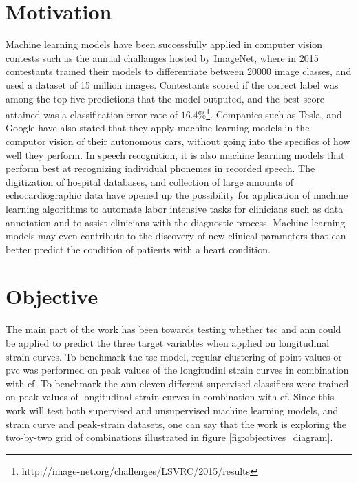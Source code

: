 \section{Motivation} \label{sec:motivation}

Machine learning models have been successfully applied in computer vision contests such as the annual challanges hosted by ImageNet, where in 2015 contestants trained their models to differentiate between 20000 image classes, and used a dataset of 15 million images. Contestants scored if the correct label was among the top five predictions that the model outputed, and the best score attained was a classification error rate of $16.4\%$\footnote{http://image-net.org/challenges/LSVRC/2015/results}. Companies such as Tesla, and Google have also stated that they apply machine learning models in the computor vision of their autonomous cars, without going into the specifics of how well they perform. In speech recognition, it is also machine learning models that perform best at recognizing individual phonemes in recorded speech. The digitization of hospital databases, and collection of large amounts of echocardiographic data have opened up the possibility for application of machine learning algorithms to automate labor intensive tasks for clinicians such as data annotation and to assist clinicians with the diagnostic process. Machine learning models may even contribute to the discovery of new clinical parameters that can better predict the condition of patients with a heart condition.

\section{Objective} \label{sec:objective}

The main part of the work has been towards testing whether \acrfull{tsc} and \acrfull{ann} could be applied to predict the three target variables when applied on longitudinal strain curves. To benchmark the \acrshort{tsc} model, regular clustering of point values or \acrfull{pvc} was performed on peak values of the longitudinl strain curves in combination with \acrshort{ef}. To benchmark the \acrfull{ann} eleven different supervised classifiers were trained on peak values of longitudinal strain curves in combination with \acrshort{ef}. Since this work will test both supervised and unsupervised machine learning models, and strain curve and peak-strain datasets, one can say that the work is exploring the two-by-two grid of combinations illustrated in figure \ref{fig:objectives_diagram}.

